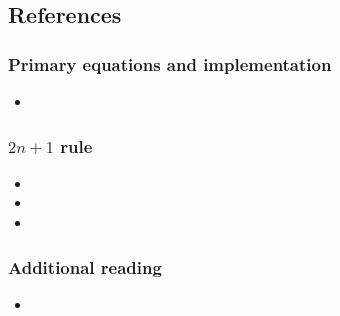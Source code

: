 \hypertarget{references}{%
  \subsection{References}\label{references}}

\hypertarget{primary-equations-and-implementation}{%
  \subsubsection{Primary equations and implementation}\label{primary-equations-and-implementation}}

\begin{itemize}
  \tightlist
\item {}
\end{itemize}

\hypertarget{n-1-rule}{%
  \subsubsection{\texorpdfstring{\(2n + 1\) rule}{2n + 1 rule}}\label{n-1-rule}}

\begin{itemize}
  \tightlist
\item {}
\item {}
\item {}
\end{itemize}

\hypertarget{additional-reading}{%
  \subsubsection{Additional reading}\label{additional-reading}}

\begin{itemize}
  \tightlist
  \item {}
\end{itemize}
